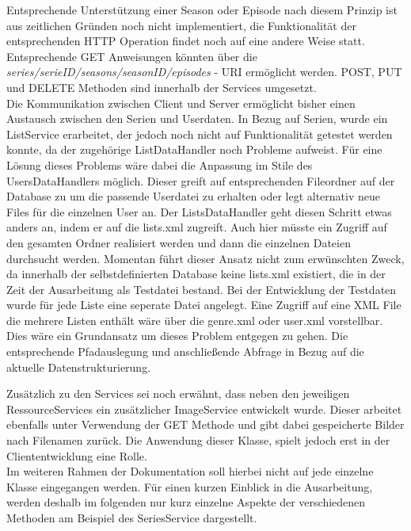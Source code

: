 \vspace{0.2cm}
Entsprechende Unterstützung einer Season oder Episode nach diesem Prinzip ist aus zeitlichen Gründen noch nicht implementiert, die Funktionalität der entsprechenden HTTP Operation findet noch auf eine andere Weise statt. Entsprechende GET Anweisungen könnten über die \textit{series/{serieID}/seasons/{seasonID}/episodes} - URI ermöglicht werden. POST, PUT und DELETE Methoden sind innerhalb der Services umgesetzt.\\
Die Kommunikation zwischen Client und Server ermöglicht bisher einen Austausch zwischen den Serien und Userdaten. In Bezug auf Serien, wurde ein ListService erarbeitet, der jedoch noch nicht auf Funktionalität getestet werden konnte, da der zugehörige ListDataHandler noch Probleme aufweist. Für eine Lösung dieses Problems wäre dabei die Anpassung im Stile des UsersDataHandlers möglich. Dieser greift auf entsprechenden Fileordner auf der Database zu um die passende Userdatei zu erhalten oder legt alternativ neue Files für die einzelnen User an. Der ListsDataHandler geht diesen Schritt etwas anders an, indem er auf die lists.xml zugreift. Auch hier müsste ein Zugriff auf den gesamten Ordner realisiert werden und dann die einzelnen Dateien durchsucht werden. Momentan führt dieser Ansatz nicht zum erwünschten Zweck, da innerhalb der selbstdefinierten Database keine lists.xml existiert, die in der Zeit der Ausarbeitung als Testdatei bestand. Bei der Entwicklung der Testdaten wurde für jede Liste eine seperate Datei angelegt. Eine Zugriff auf eine XML File die mehrere Listen enthält wäre über die genre.xml oder user.xml vorstellbar. Dies wäre ein Grundansatz um dieses Problem entgegen zu gehen. Die entsprechende Pfadauslegung und anschließende Abfrage in Bezug auf die aktuelle Datenstrukturierung.

Zusätzlich zu den Services sei noch erwähnt, dass neben den jeweiligen RessourceServices ein zusätzlicher ImageService entwickelt wurde. Dieser arbeitet ebenfalls unter Verwendung der GET Methode und gibt dabei gespeicherte Bilder nach Filenamen zurück. Die Anwendung dieser Klasse, spielt jedoch erst in der Cliententwicklung eine Rolle.\\

Im weiteren Rahmen der Dokumentation soll hierbei nicht auf jede einzelne Klasse eingegangen werden. Für einen kurzen Einblick in die Ausarbeitung, werden deshalb im folgenden nur kurz einzelne Aspekte der verschiedenen Methoden am Beispiel des SeriesService dargestellt.\\

